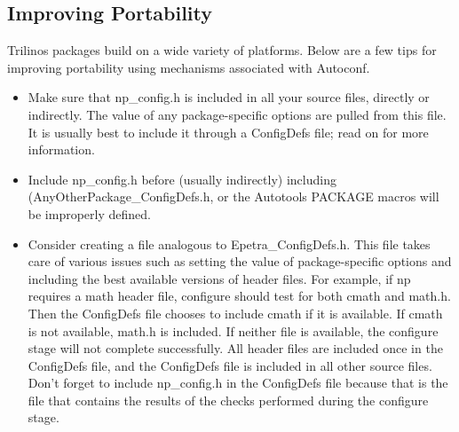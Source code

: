 \documentclass[12pt,strict]{TrilinosDevGuide}
\begin{document}
\subsection{Improving Portability}

Trilinos packages build on a wide variety of platforms.  Below are a few tips 
for improving portability using mechanisms associated with Autoconf.

\begin{itemize}
\item Make sure that np\_config.h is included in all your source
files, directly or indirectly.  The value of any package-specific options are 
pulled from this file.  It is usually best to include it through a 
ConfigDefs file; read on for more information.  

\item Include np\_config.h before (usually indirectly) including \newline
(AnyOtherPackage\_ConfigDefs.h, or the Autotools PACKAGE macros will 
be improperly defined.

\item Consider creating a file analogous to Epetra\_ConfigDefs.h.  This file 
takes care of various issues such as setting the value of package-specific 
options and including the best available versions of header files.  For 
example, if np requires a math header file, configure should test for both 
cmath and math.h.  Then the ConfigDefs file chooses to include cmath if it 
is available.  If cmath is not available, math.h is included.  If neither file 
is available, the configure stage will not complete successfully.  All header 
files are included once in the ConfigDefs file, and the ConfigDefs file is 
included in all other source files.  Don't forget to include np\_config.h in 
the ConfigDefs file because that is the file that contains the results of the 
checks performed during the configure stage.

\end{itemize}
\end{document}
